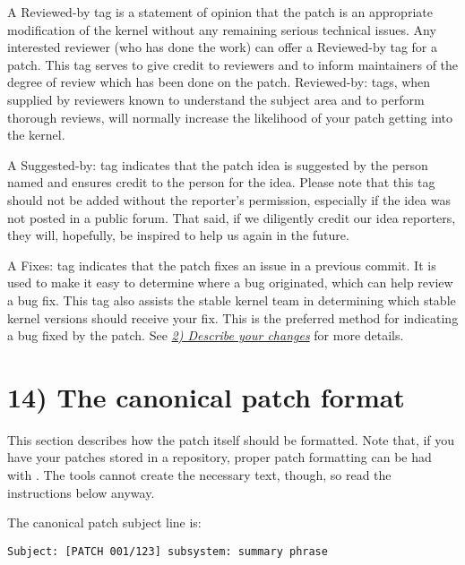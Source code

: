 \documentclass[a4paper,8pt,english]{sphinxmanual}
\begin{document}
A Reviewed-by tag is a statement of opinion that the patch is an
appropriate modification of the kernel without any remaining serious
technical issues.  Any interested reviewer (who has done the work) can
offer a Reviewed-by tag for a patch.  This tag serves to give credit to
reviewers and to inform maintainers of the degree of review which has been
done on the patch.  Reviewed-by: tags, when supplied by reviewers known to
understand the subject area and to perform thorough reviews, will normally
increase the likelihood of your patch getting into the kernel.

A Suggested-by: tag indicates that the patch idea is suggested by the person
named and ensures credit to the person for the idea. Please note that this
tag should not be added without the reporter's permission, especially if the
idea was not posted in a public forum. That said, if we diligently credit our
idea reporters, they will, hopefully, be inspired to help us again in the
future.

A Fixes: tag indicates that the patch fixes an issue in a previous commit. It
is used to make it easy to determine where a bug originated, which can help
review a bug fix. This tag also assists the stable kernel team in determining
which stable kernel versions should receive your fix. This is the preferred
method for indicating a bug fixed by the patch. See {\hyperref[process/submitting\string-patches:describe\string-changes]{\emph{2) Describe your changes}}}
for more details.


\section{14) The canonical patch format}
\label{process/submitting-patches:the-canonical-patch-format}
This section describes how the patch itself should be formatted.  Note
that, if you have your patches stored in a  repository, proper patch
formatting can be had with .  The tools cannot create
the necessary text, though, so read the instructions below anyway.

The canonical patch subject line is:

\begin{Verbatim}[commandchars=\\\{\}]
Subject: [PATCH 001/123] subsystem: summary phrase
\end{Verbatim}
\end{document}

